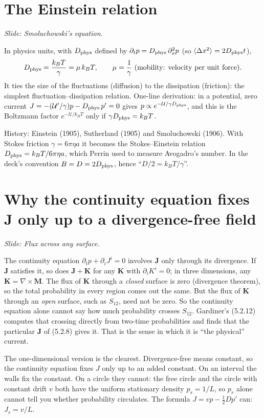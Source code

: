 \documentclass[11pt]{article}
\newcommand{\cU}{\mathcal{U}}
\begin{document}
\section{The Einstein relation}
\emph{Slide: Smoluchowski's equation.}

In physics units, with $D_{\rm phys}$ defined by $\partial_tp=D_{\rm phys}\,\partial_x^2p$ (so $\langle\Delta
x^2\rangle=2D_{\rm phys}t$),
\[
  D_{\rm phys}=\frac{k_BT}{\gamma}=\mu\,k_BT,\qquad \mu=\frac1\gamma\ \text{(mobility: velocity per unit force)}.
\]
It ties the size of the fluctuations (diffusion) to the dissipation (friction): the simplest fluctuation--dissipation
relation. One-line derivation: in a potential, zero current
$J=-(\cU'/\gamma)p-D_{\rm phys}\,p'=0$ gives $p\propto e^{-\cU/\gamma D_{\rm phys}}$, and this is the Boltzmann factor
$e^{-\cU/k_BT}$ only if $\gamma D_{\rm phys}=k_BT$.

History: Einstein (1905), Sutherland (1905) and Smoluchowski (1906). With Stokes friction $\gamma=6\pi\eta a$ it
becomes the Stokes--Einstein relation $D_{\rm phys}=k_BT/6\pi\eta a$, which Perrin used to measure Avogadro's number. In
the deck's convention $B=D=2D_{\rm phys}$, hence ``$D/2=k_BT/\gamma$''.

\section{Why the continuity equation fixes \texorpdfstring{$\bm J$}{J} only up to a divergence-free field}
\emph{Slide: Flux across any surface.}

The continuity equation $\partial_tp+\partial_iJ^i=0$ involves $\bm J$ only through its divergence. If $\bm J$
satisfies it, so does $\bm J+\bm K$ for any $\bm K$ with $\partial_iK^i=0$; in three dimensions, any $\bm K=\nabla\times\bm
M$. The flux of $\bm K$ through a \emph{closed} surface is zero (divergence theorem), so the total probability in every
region comes out the same. But the flux of $\bm K$ through an \emph{open} surface, such as $S_{12}$, need not be
zero. So the continuity equation alone cannot say how much probability crosses $S_{12}$. Gardiner's (5.2.12) computes
that crossing directly from two-time probabilities and finds that the particular $\bm J$ of (5.2.8) gives it. That is the
sense in which it is ``the physical'' current.

The one-dimensional version is the clearest. Divergence-free means constant, so the continuity equation fixes $J$ only
up to an added constant. On an interval the walls fix the constant. On a circle they cannot: the free circle and the
circle with constant drift $v$ both have the uniform stationary density $p_s=1/L$, so $p_s$ alone cannot tell you
whether probability circulates. The formula $J=vp-\frac12Dp'$ can: $J_s=v/L$.
\end{document}
